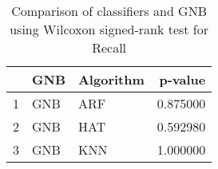 \begin{table}
\footnotesize
\caption{Comparison of classifiers and GNB using Wilcoxon signed-rank test for Recall}
\label{tab:GNB wilcoxon Recall comparison}
\begin{tabular}{lllr}
\hline
 & GNB & Algorithm & p-value \\
\hline
1 & GNB & ARF & 0.875000 \\
2 & GNB & HAT & 0.592980 \\
3 & GNB & KNN & 1.000000 \\
\hline
\end{tabular}
\end{table}
